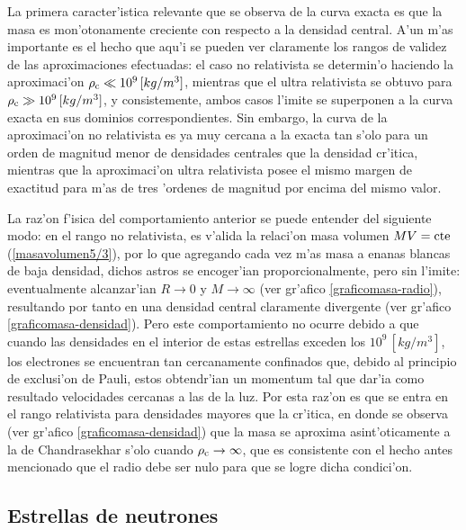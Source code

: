 La primera caracter'istica relevante que se observa de la curva exacta es que la masa es mon'otonamente creciente con respecto a la densidad central. A'un m'as importante es el hecho que aqu'i se pueden ver claramente los rangos de validez de las aproximaciones efectuadas: el caso no relativista se determin'o haciendo la aproximaci'on $\rho_{\rm c}\ll10^{9}\,[kg/m^3]$, mientras que el ultra relativista se obtuvo para $\rho_{\rm c}\gg10^{9}\,[kg/m^3]$, y consistemente, ambos casos l'imite se superponen a la curva exacta en sus dominios correspondientes. Sin embargo, la curva de la aproximaci'on no relativista es ya muy cercana a la exacta tan s'olo para un orden de magnitud menor de densidades centrales que la densidad cr'itica, mientras que la aproximaci'on ultra relativista posee el mismo margen de exactitud para m'as de tres 'ordenes de magnitud por encima del mismo valor.

La raz'on f'isica del comportamiento anterior se puede entender del siguiente modo: en el rango no relativista, es v'alida la relaci'on masa volumen $MV={\rm cte}$ (\eqref{masavolumen5/3}), por lo que agregando cada vez m'as masa a enanas blancas de baja densidad, dichos astros se encoger'ian proporcionalmente, pero sin l'imite: eventualmente alcanzar'ian $R\to 0$ y $M\to\infty$ (ver gr'afico \ref{graficomasa-radio}), resultando por tanto en una densidad central claramente divergente (ver gr'afico \ref{graficomasa-densidad}). Pero este comportamiento no ocurre debido a que cuando las densidades en el interior de estas estrellas exceden los $10^{9}\,[kg/m^3]$, los electrones se encuentran tan cercanamente confinados que, debido al principio de exclusi'on de Pauli, estos obtendr'ian un momentum tal que dar'ia como resultado velocidades cercanas a las de la luz. Por esta raz'on es que se entra en el rango relativista para densidades mayores que la cr'itica, en donde se observa (ver gr'afico \ref{graficomasa-densidad}) que la masa se aproxima asint'oticamente a la de Chandrasekhar s'olo cuando  $\rho_{\rm c}\to\infty$, que es consistente con el hecho antes mencionado que el radio debe ser nulo para que se logre dicha condici'on.


\subsection{Estrellas de neutrones}

